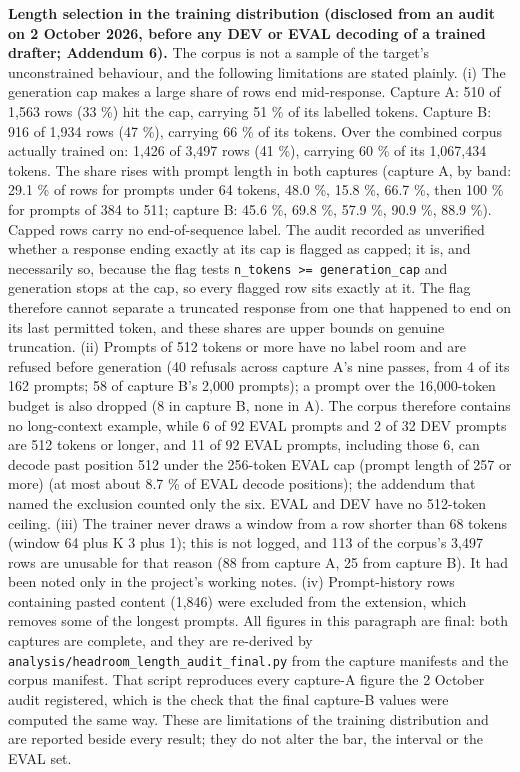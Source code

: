 \documentclass[
  11pt,
]{article}
\newcounter{none} %
\begin{document}
\textbf{Length selection in the training distribution (disclosed from an
audit on 2 October 2026, before any DEV or EVAL decoding of a trained
drafter; Addendum 6).} The corpus is not a sample of the target's
unconstrained behaviour, and the following limitations are stated
plainly. (i) The generation cap makes a large share of rows end
mid-response. Capture A: 510 of 1,563 rows (33 \%) hit the cap, carrying
51 \% of its labelled tokens. Capture B: 916 of 1,934 rows (47 \%),
carrying 66 \% of its tokens. Over the combined corpus actually trained
on: 1,426 of 3,497 rows (41 \%), carrying 60 \% of its 1,067,434 tokens.
The share rises with prompt length in both captures (capture A, by band:
29.1 \% of rows for prompts under 64 tokens, 48.0 \%, 15.8 \%, 66.7 \%,
then 100 \% for prompts of 384 to 511; capture B: 45.6 \%, 69.8 \%, 57.9
\%, 90.9 \%, 88.9 \%). Capped rows carry no end-of-sequence label. The
audit recorded as unverified whether a response ending exactly at its
cap is flagged as capped; it is, and necessarily so, because the flag
tests \texttt{n\_tokens\ \textgreater{}=\ generation\_cap} and
generation stops at the cap, so every flagged row sits exactly at it.
The flag therefore cannot separate a truncated response from one that
happened to end on its last permitted token, and these shares are upper
bounds on genuine truncation. (ii) Prompts of 512 tokens or more have no
label room and are refused before generation (40 refusals across capture
A's nine passes, from 4 of its 162 prompts; 58 of capture B's 2,000
prompts); a prompt over the 16,000-token budget is also dropped (8 in
capture B, none in A). The corpus therefore contains no long-context
example, while 6 of 92 EVAL prompts and 2 of 32 DEV prompts are 512
tokens or longer, and 11 of 92 EVAL prompts, including those 6, can
decode past position 512 under the 256-token EVAL cap (prompt length of
257 or more) (at most about 8.7 \% of EVAL decode positions); the
addendum that named the exclusion counted only the six. EVAL and DEV
have no 512-token ceiling. (iii) The trainer never draws a window from a
row shorter than 68 tokens (window 64 plus K 3 plus 1); this is not
logged, and 113 of the corpus's 3,497 rows are unusable for that reason
(88 from capture A, 25 from capture B). It had been noted only in the
project's working notes. (iv) Prompt-history rows containing pasted
content (1,846) were excluded from the extension, which removes some of
the longest prompts. All figures in this paragraph are final: both
captures are complete, and they are re-derived by
\texttt{analysis/headroom\_length\_audit\_final.py} from the capture
manifests and the corpus manifest. That script reproduces every
capture-A figure the 2 October audit registered, which is the check that
the final capture-B values were computed the same way. These are
limitations of the training distribution and are reported beside every
result; they do not alter the bar, the interval or the EVAL set.
\end{document}
